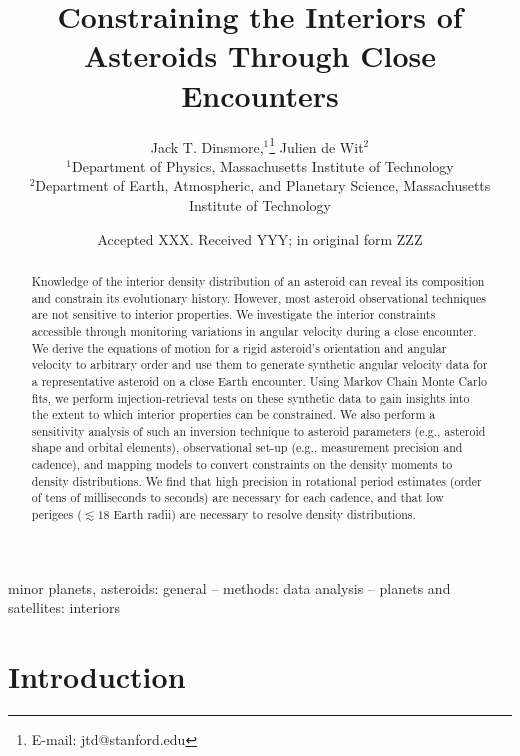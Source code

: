 \documentclass[fleqn,usenatbib]{mnras}
\title[Flyby Constraints on Asteroids Interiors]{Constraining the Interiors of Asteroids Through Close Encounters}
\author[Jack T. Dinsmore, Julien de Wit]{
Jack T. Dinsmore,$^{1}$\thanks{E-mail: jtd@stanford.edu}
Julien de Wit$^{2}$
\\
$^{1}$Department of Physics, Massachusetts Institute of Technology\\
$^{2}$Department of Earth, Atmospheric, and Planetary Science, Massachusetts Institute of Technology
}
\date{Accepted XXX. Received YYY; in original form ZZZ}
\begin{document}
\label{firstpage}
\pagerange{\pageref{firstpage}--\pageref{lastpage}}
\maketitle

\begin{abstract}
  Knowledge of the interior density distribution of an asteroid can reveal its composition and constrain its evolutionary history. However, most asteroid observational techniques are not sensitive to interior properties. We investigate the interior constraints accessible through monitoring variations in angular velocity during a close encounter. We derive the equations of motion for a rigid asteroid's orientation and angular velocity to arbitrary order and use them to generate synthetic angular velocity data for a representative asteroid on a close Earth encounter. Using Markov Chain Monte Carlo fits, we perform injection-retrieval tests on these synthetic data to gain insights into the extent to which interior properties can be constrained. We also perform a sensitivity analysis of such an inversion technique to asteroid parameters (e.g., asteroid shape and orbital elements), observational set-up (e.g., measurement precision and cadence), and mapping models to convert constraints on the density moments to density distributions. We find that high precision in rotational period estimates (order of tens of milliseconds to seconds) are necessary for each cadence, and that low perigees ($\lesssim 18$ Earth radii) are necessary to resolve density distributions.
\end{abstract}

\begin{keywords}
  minor planets, asteroids: general -- methods: data analysis -- planets and satellites: interiors
\end{keywords}



\section{Introduction}
\end{document}
